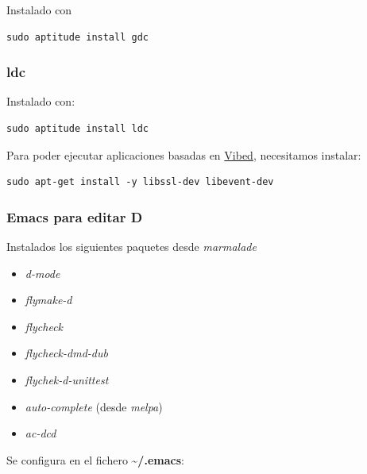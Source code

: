 \documentclass[12pt,spanish,]{scrartcl}
\providecommand{\tightlist}{%
  \setlength{\itemsep}{0pt}\setlength{\parskip}{0pt}}
\begin{document}
Instalado con

\begin{verbatim}
sudo aptitude install gdc
\end{verbatim}

\hypertarget{ldc}{%
\subsubsection{ldc}\label{ldc}}

Instalado con:

\begin{verbatim}
sudo aptitude install ldc
\end{verbatim}

Para poder ejecutar aplicaciones basadas en
\href{http://vibed.org/}{Vibed}, necesitamos instalar:

\begin{verbatim}
sudo apt-get install -y libssl-dev libevent-dev
\end{verbatim}

\hypertarget{emacs-para-editar-d}{%
\subsubsection{Emacs para editar D}\label{emacs-para-editar-d}}

Instalados los siguientes paquetes desde \emph{marmalade}

\begin{itemize}
\tightlist
\item
  \emph{d-mode}
\item
  \emph{flymake-d}
\item
  \emph{flycheck}
\item
  \emph{flycheck-dmd-dub}
\item
  \emph{flychek-d-unittest}
\item
  \emph{auto-complete} (desde \emph{melpa})
\item
  \emph{ac-dcd}
\end{itemize}

Se configura en el fichero \textbf{\textasciitilde{}/.emacs}:
\end{document}
